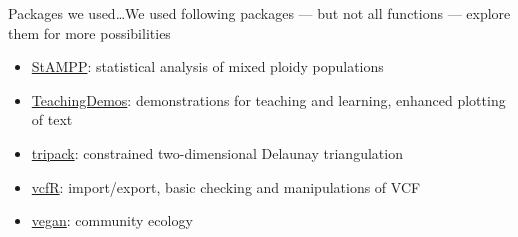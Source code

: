 \documentclass[compress, ucs, xelatex, 11pt, xcolor=svgnames,
	hyperref={
		bookmarks=true,
		unicode=true,
		colorlinks=true,
		pdftitle={Molecular data in R},
		plainpages=false,
		pdfauthor={Vojtech Zeisek},
		pdfsubject={Course about phylogeny and evolution in R},
		pdfcreator={XeLaTeX},
		pdfkeywords={R, evolution, phylogeny, molecular data},
		linkcolor=Tomato,
		anchorcolor=SaddleBrown,
		citecolor=Goldenrod,
		filecolor=DarkMagenta,
		menucolor=Sienna,
		urlcolor=DarkTurquoise,
		pdftex},
	url={hyphens, lowtilde} %
	]{beamer}
\begin{document}
\begin{frame}[allowframebreaks]{Packages we used\ldots}{We used following packages --- but not all functions --- explore them for more possibilities}
\begin{itemize}
		\item \href{https://CRAN.R-project.org/package=StAMPP}{StAMPP}: statistical analysis of mixed ploidy populations
		\item \href{https://CRAN.R-project.org/package=TeachingDemos}{TeachingDemos}: demonstrations for teaching and learning, enhanced plotting of text
		\item \href{https://CRAN.R-project.org/package=tripack}{tripack}: constrained two-dimensional Delaunay triangulation
		\item \href{https://CRAN.R-project.org/package=vcfR}{vcfR}: import/export, basic checking and manipulations of VCF
		\item \href{https://CRAN.R-project.org/package=vegan}{vegan}: community ecology
	\end{itemize}
\end{frame}
\end{document}
